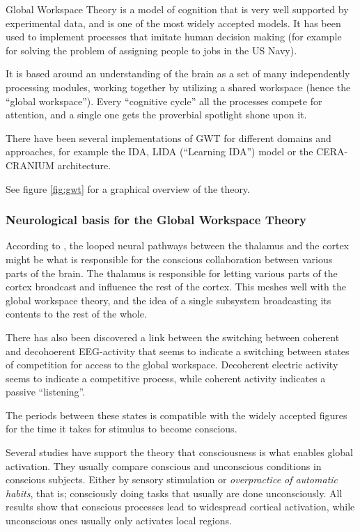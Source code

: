 Global Workspace Theory is a model of cognition that is very well supported by experimental data, and is one of the most widely accepted models. \cite{dehaene2001towards} It has been used to implement processes that imitate human decision making (for example for solving the problem of assigning people to jobs in the US Navy).\cite{baars2005gwt}\cite{franklin2003interacting}

It is based around an understanding of the brain as a set of many independently processing modules, working together by utilizing a shared workspace (hence the ``global workspace''). Every ``cognitive cycle'' all the processes compete for attention, and a single one gets the proverbial spotlight shone upon it.\cite{baars2005gwt}

There have been several implementations of GWT for different domains and approaches, for example the IDA, LIDA (``Learning IDA'') model\cite{franklin2007lida} or the CERA-CRANIUM architecture\cite{arrabales2009ceracranium}.

See figure \ref{fig:gwt} for a graphical overview of the theory.


\subsubsection{Neurological basis for the Global Workspace Theory}
According to \cite{llinas1998neuronal}, the looped neural pathways between the thalamus and the cortex might be what is responsible for the conscious collaboration between various parts of the brain. The thalamus is responsible for letting various parts of the cortex broadcast and influence the rest of the cortex. This meshes well with the global workspace theory, and the idea of a single subsystem broadcasting its contents to the rest of the whole.

There has also been discovered a link between the switching between coherent and decohoerent EEG-activity that seems to indicate a switching between states of competition for access to the global workspace. Decoherent electric activity seems to indicate a competitive process, while coherent activity indicates a passive ``listening''.\cite{freeman2003neurobiological}

The periods between these states is compatible with the widely accepted figures for the time it takes for stimulus to become conscious.\cite{shanahan2005applying}

Several studies have support the theory that consciousness is what enables global activation. They usually compare conscious and unconscious conditions in conscious subjects. Either by sensory stimulation or {\em overpractice of automatic habits}, that is; consciously doing tasks that usually are done unconsciously. All results show that conscious processes lead to widespread cortical activation, while unconscious ones usually only activates local regions.\cite{baars2003brain}

